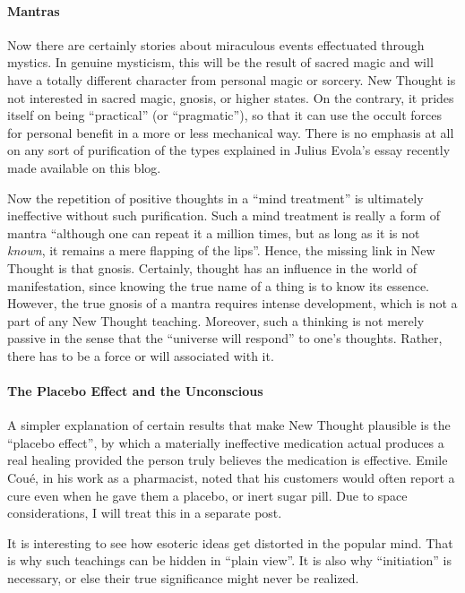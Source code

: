 \paragraph{Mantras}


Now there are certainly stories about miraculous events effectuated through mystics. In genuine mysticism, this will be the result of sacred magic and will have a totally different character from personal magic or sorcery. New Thought is not interested in sacred magic, gnosis, or higher states. On the contrary, it prides itself on being ``practical'' (or ``pragmatic''), so that it can use the occult forces for personal benefit in a more or less mechanical way. There is no emphasis at all on any sort of purification of the types explained in Julius Evola's essay recently made available on this blog.

Now the repetition of positive thoughts in a ``mind treatment'' is ultimately ineffective without such purification. Such a mind treatment is really a form of mantra ``although one can repeat it a million times, but as long as it is not \emph{known}, it remains a mere flapping of the lips''. Hence, the missing link in New Thought is that gnosis. Certainly, thought has an influence in the world of manifestation, since knowing the true name of a thing is to know its essence. However, the true gnosis of a mantra requires intense development, which is not a part of any New Thought teaching. Moreover, such a thinking is not merely passive in the sense that the ``universe will respond'' to one's thoughts. Rather, there has to be a force or will associated with it.

\paragraph{The Placebo Effect and the Unconscious}


A simpler explanation of certain results that make New Thought plausible is the ``placebo effect'', by which a materially ineffective medication actual produces a real healing provided the person truly believes the medication is effective. Emile Coué, in his work as a pharmacist, noted that his customers would often report a cure even when he gave them a placebo, or inert sugar pill. Due to space considerations, I will treat this in a separate post.

It is interesting to see how esoteric ideas get distorted in the popular mind. That is why such teachings can be hidden in ``plain view''. It is also why ``initiation'' is necessary, or else their true significance might never be realized.

